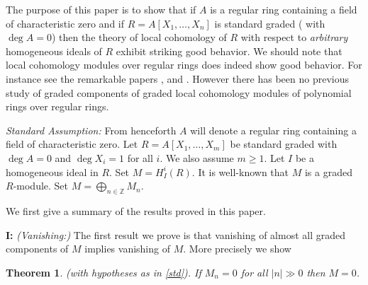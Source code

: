\documentclass{amsart}
\newcommand{\ZZ}{\mathbb{Z} }
\theoremstyle{plain}
\newtheorem{theorem}{Theorem}[section]
\theoremstyle{definition}
\theoremstyle{remark}
\begin{document}
The purpose of this paper is to show that if $A$ is a regular ring containing a field of characteristic zero  and 
if $R = A[X_1,\ldots, X_n]$ is standard graded ( with $\deg A = 0$) then the theory of local cohomology of
$R$ with respect to \emph{arbitrary} homogeneous ideals of $R$ exhibit striking good behavior.
We should note that local cohomology modules over regular rings does indeed show good behavior.
For instance see the remarkable papers \cite{HuSh}, \cite{Lyu-1} and \cite{Lyu-2}. However
there has been no previous study of graded components of graded local cohomology modules of polynomial rings over regular rings. 



 
\s \label{std} \emph{Standard Assumption:} From henceforth $A$ will denote a regular ring containing a field of characteristic zero. Let $R = A[X_1,\ldots, X_m]$ be standard graded with $\deg A = 0$ and $\deg X_i = 1$ for all $i$. We also assume $m \geq 1$. Let $I$ be a homogeneous ideal in $R$. Set $M = H^i_I(R)$. It is well-known that $M$ is a graded $R$-module. Set $M = \bigoplus_{n \in \ZZ}M_n$.

We first give a summary of the results proved in this paper.

 \textbf{I:} \textit{(Vanishing:)}  The first result we prove is that vanishing of almost all graded components of $M$ implies vanishing of $M$. More precisely we show
 \begin{theorem}\label{vanish}
(with hypotheses as in \ref{std}).  If $M _n = 0$ for all $|n|  \gg 0$ then  
$M = 0$.
 \end{theorem}
 
\end{document}
